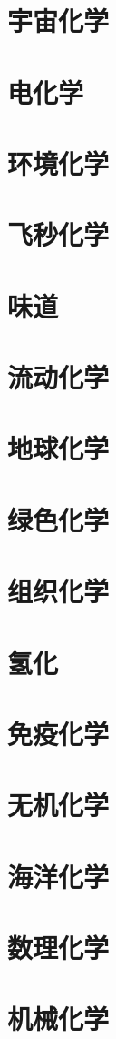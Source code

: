 \documentclass[UTF8]{NatureUniverse}
\begin{document}
\section{宇宙化学}
\section{电化学}
\section{环境化学}
\section{飞秒化学}
\section{味道}
\section{流动化学}
\section{地球化学}
\section{绿色化学}
\section{组织化学}
\section{氢化}
\section{免疫化学}
\section{无机化学}
\section{海洋化学}
\section{数理化学}
\section{机械化学}
\end{document}
